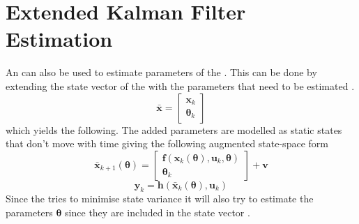 

\section{Extended Kalman Filter Estimation}
An \abbrEKF can also be used to estimate parameters of the \abbrROV. This can be done by extending the state vector of the \abbrEKF with the parameters that need to be estimated \citep{Roger}.
\begin{equation}
\bar{\boldsymbol{x}} = \begin{bmatrix}
\boldsymbol{x}_k\\
\boldsymbol{\theta}_k
\end{bmatrix}
\end{equation}
which yields the following.
The added parameters are modelled as static states that don't move with time giving the following augmented state-space form 
\begin{equation}
\bar{\boldsymbol{x}}_{k+1}(\boldsymbol{\theta}) =\begin{bmatrix}
\boldsymbol{f}(\boldsymbol{x}_k(\boldsymbol{\theta}),\boldsymbol{u}_k,\boldsymbol{\theta})\\
\boldsymbol{\theta}_k
\end{bmatrix} 
+\boldsymbol{v}
\end{equation}
\begin{equation}
\boldsymbol{y}_k=\boldsymbol{h}(\bar{\boldsymbol{x}}_k(\boldsymbol{\theta}),\boldsymbol{u}_k)
\end{equation}
Since the \abbrEKF tries to minimise state variance it will also try to estimate the parameters $\boldsymbol{\theta}$ since they are included in the state vector \citep{Roger}.

